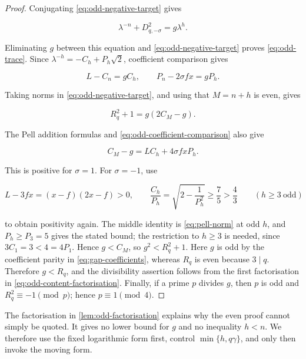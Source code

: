 \begin{proof}
Conjugating \cref{eq:odd-negative-target} gives

\begin{equation}
 \lambda^{-n}+D_{q,-\sigma}^2=g\lambda^h.
 \label{eq:odd-negative-conjugate}
\end{equation}

Eliminating $g$ between this equation and
\cref{eq:odd-negative-target} proves \cref{eq:odd-trace}. Since
$\lambda^{-h}=-C_h+P_h\sqrt2$, coefficient comparison gives

\begin{equation}
 L-C_n=gC_h,
 \qquad
 P_n-2\sigma fx=gP_h.
 \label{eq:odd-coefficient-comparison}
\end{equation}

Taking norms in \cref{eq:odd-negative-target}, and using that $M=n+h$ is
even, gives

\begin{equation}
 R_q^2+1=g(2C_M-g).
\end{equation}

The Pell addition formulas and \cref{eq:odd-coefficient-comparison} also
give

\begin{equation}
 C_M-g=LC_h+4\sigma fxP_h.
 \label{eq:odd-positive-factor}
\end{equation}

This is positive for $\sigma=1$. For $\sigma=-1$, use

\begin{equation}
 L-3fx=(x-f)(2x-f)>0,
 \qquad
 \frac{C_h}{P_h}=\sqrt{2-\frac1{P_h^2}}\geqslant\frac75>\frac43
 \qquad(h\geqslant3\ \text{odd})
\end{equation}

to obtain positivity again. The middle identity is
\cref{eq:pell-norm} at odd $h$, and $P_h\geqslant P_3=5$ gives the stated
bound; the restriction to $h\geqslant3$ is needed, since $3C_1=3<4=4P_1$. Hence $g<C_M$, so
$g^2<R_q^2+1$. Here $g$ is odd by the coefficient parity in
\cref{eq:gap-coefficients}, whereas $R_q$ is even because $3\mid q$.
Therefore $g<R_q$, and the divisibility assertion follows from the first
factorisation in \cref{eq:odd-content-factorisation}. Finally, if a prime
$p$ divides $g$, then $p$ is odd and $R_q^2\equiv-1\pmod p$; hence
$p\equiv1\pmod4$.
\end{proof}

The factorisation in \cref{lem:odd-factorisation} explains why the even
proof cannot simply be quoted. It gives no lower bound for $g$ and no
inequality $h<n$. We therefore use the fixed logarithmic form first, control
$\min\{h,q\gamma\}$, and only then invoke the moving form.

